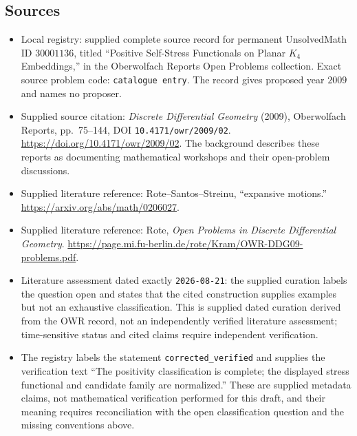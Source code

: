 \documentclass[11pt]{article}
\begin{document}
\subsection{Sources}
\begin{itemize}
\item Local registry: supplied complete source record for permanent UnsolvedMath ID \(30001136\), titled ``Positive Self-Stress Functionals on Planar \(K_4\) Embeddings,'' in the Oberwolfach Reports Open Problems collection. Exact source problem code: \texttt{catalogue entry}. The record gives proposed year \(2009\) and names no proposer.
\item Supplied source citation: \emph{Discrete Differential Geometry} (2009), Oberwolfach Reports, pp.~75--144, DOI \texttt{10.4171/owr/2009/02}. \url{https://doi.org/10.4171/owr/2009/02}. The background describes these reports as documenting mathematical workshops and their open-problem discussions.
\item Supplied literature reference: Rote--Santos--Streinu, ``expansive motions.'' \url{https://arxiv.org/abs/math/0206027}.
\item Supplied literature reference: Rote, \emph{Open Problems in Discrete Differential Geometry}. \url{https://page.mi.fu-berlin.de/rote/Kram/OWR-DDG09-problems.pdf}.
\item Literature assessment dated exactly \texttt{2026-08-21}: the supplied curation labels the question open and states that the cited construction supplies examples but not an exhaustive classification. This is supplied dated curation derived from the OWR record, not an independently verified literature assessment; time-sensitive status and cited claims require independent verification.
\item The registry labels the statement \texttt{corrected\_verified} and supplies the verification text ``The positivity classification is complete; the displayed stress functional and candidate family are normalized.'' These are supplied metadata claims, not mathematical verification performed for this draft, and their meaning requires reconciliation with the open classification question and the missing conventions above.
\end{itemize}
\end{document}

